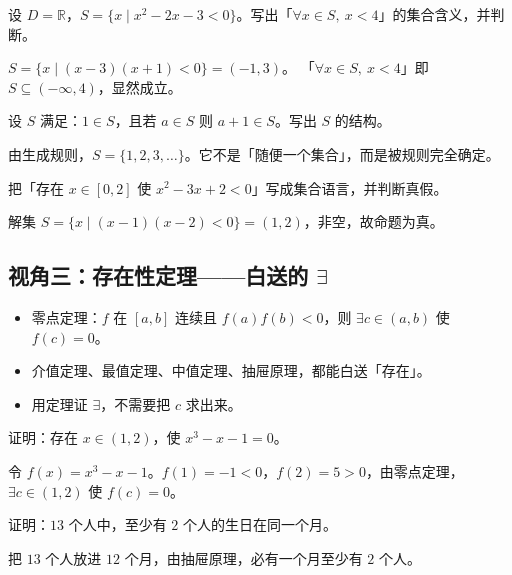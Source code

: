 \begin{explore}
\begin{example}
设 $D=\mathbb{R}$，$S=\{x\mid x^2-2x-3<0\}$。写出「$\forall x\in S,\ x<4$」的集合含义，并判断。
\end{example}
\begin{solution}
$S=\{x\mid(x-3)(x+1)<0\}=(-1,3)$。
「$\forall x\in S,\ x<4$」即 $S\subseteq(-\infty,4)$，显然成立。
\end{solution}

\begin{example}
设 $S$ 满足：$1\in S$，且若 $a\in S$ 则 $a+1\in S$。写出 $S$ 的结构。
\end{example}
\begin{solution}
由生成规则，$S=\{1,2,3,\dots\}$。它不是「随便一个集合」，而是被规则完全确定。
\end{solution}

\begin{problem}
把「存在 $x\in[0,2]$ 使 $x^2-3x+2<0$」写成集合语言，并判断真假。
\end{problem}
\begin{solution}
解集 $S=\{x\mid(x-1)(x-2)<0\}=(1,2)$，非空，故命题为真。
\end{solution}

\subsection{视角三：存在性定理——白送的 $\exists$}

\begin{itemize}
  \item 零点定理：$f$ 在 $[a,b]$ 连续且 $f(a)f(b)<0$，则 $\exists c\in(a,b)$ 使 $f(c)=0$。
  \item 介值定理、最值定理、中值定理、抽屉原理，都能白送「存在」。
  \item 用定理证 $\exists$，不需要把 $c$ 求出来。
\end{itemize}

\begin{example}
证明：存在 $x\in(1,2)$，使 $x^3-x-1=0$。
\end{example}
\begin{solution}
令 $f(x)=x^3-x-1$。$f(1)=-1<0$，$f(2)=5>0$，由零点定理，
$\exists c\in(1,2)$ 使 $f(c)=0$。
\end{solution}

\begin{example}
证明：$13$ 个人中，至少有 $2$ 个人的生日在同一个月。
\end{example}
\begin{solution}
把 $13$ 个人放进 $12$ 个月，由抽屉原理，必有一个月至少有 $2$ 个人。
\end{solution}


\end{explore}
